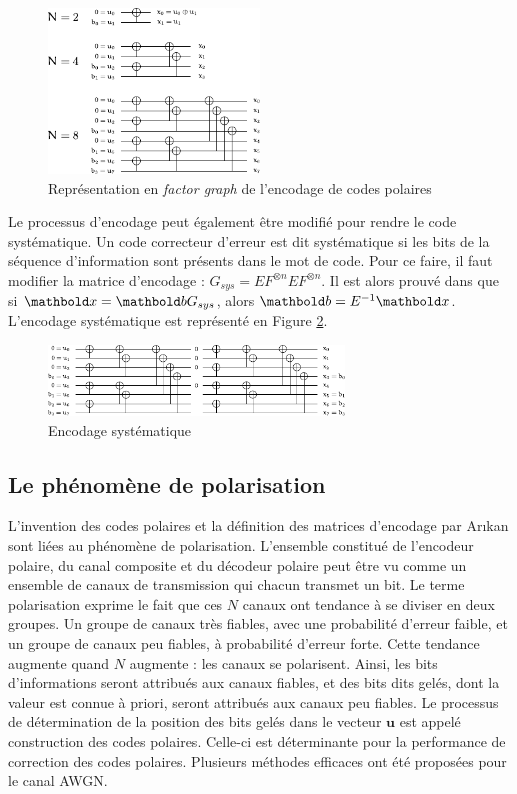 \begin{figure}[t]
\centering
\includegraphics[width=0.5\textwidth]{main/ch1_fig/Graph_N_rec}
\caption{Représentation en \textit{factor graph} de l'encodage de codes polaires}
\label{fig:encodage}
\end{figure}

Le processus d'encodage peut également être modifié pour rendre le code systématique. Un code correcteur d'erreur est dit systématique si les bits de la séquence d'information sont présents dans le mot de code. Pour ce faire, il faut modifier la matrice d'encodage : $G_{sys}=EF^{\otimes n}EF^{\otimes n}$. Il est alors prouvé dans \cite{arikan_systematic_2011} que si $\mb{x}=\mb{b}G_{sys}$, alors $\mb{b}=E^{-1}\mb{x}$. L'encodage systématique est représenté en Figure \ref{fig:sys}.

\begin{figure}[t]
\centering
\includegraphics[width=0.7\textwidth]{main/ch1_fig/Graph_N_sys}
\caption{Encodage systématique}
\label{fig:sys}
\end{figure}

\subsection{Le phénomène de polarisation}

L'invention des codes polaires et la définition des matrices d'encodage par Ar{\i}kan \cite{arikan_channel_2009} sont liées au phénomène de polarisation. L'ensemble constitué de l'encodeur polaire, du canal composite et du décodeur polaire peut être vu comme un ensemble de canaux de transmission qui chacun transmet un bit. Le terme \og polarisation \fg exprime le fait que ces $N$ canaux ont tendance à se diviser en deux groupes. Un groupe de canaux très fiables, avec une probabilité d'erreur faible, et un groupe de canaux peu fiables, à probabilité d'erreur forte. Cette tendance augmente quand $N$ augmente : les canaux se polarisent. Ainsi, les bits d'informations seront attribués aux canaux fiables, et des bits dits gelés, dont la valeur est connue à priori, seront attribués aux canaux peu fiables. Le processus de détermination de la position des bits gelés dans le vecteur $\mathbold{u}$ est appelé construction des codes polaires. Celle-ci est déterminante pour la performance de correction des codes polaires. Plusieurs méthodes efficaces ont été proposées \cite{tal_how_2013,trifonov_efficient_2012} pour le canal AWGN.

